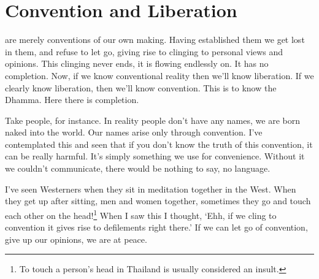 

\chapter{Convention and Liberation}

 are merely conventions of our own making. Having established them we get lost in them, and refuse to let go, giving rise to clinging to personal views and opinions. This clinging never ends, it is  flowing endlessly on. It has no completion. Now, if we know conventional reality then we'll know liberation. If we clearly know liberation, then we'll know convention. This is to know the Dhamma. Here there is completion. 

Take people, for instance. In reality people don't have any names, we are born naked into the world. Our names arise only through convention. I've contemplated this and seen that if you don't know the truth of this convention, it can be really harmful. It's simply something we use for convenience. Without it we couldn't communicate, there would be nothing to say, no language. 

I've seen Westerners when they sit in meditation together in the West. When they get up after sitting, men and women together, sometimes they go and touch each other on the head!\footnote{To touch a person's head in Thailand is usually considered an insult. } When I saw this I thought, `Ehh, if we cling to convention it gives rise to defilements right there.' If we can let go of convention, give up our opinions, we are at peace. 


